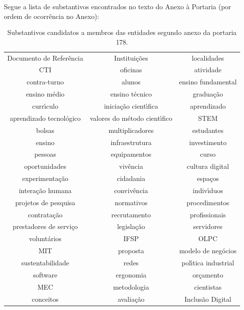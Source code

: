 \documentclass[
12pt,		%
openright,	%
twoside,  %
a4paper,			%
chapter=TITLE,		%
english,			%
french,				%
spanish,			%
brazil				%
]{USPSC-classe/USPSC_RedarTex}
\begin{document}
Segue a lista de substantivos encontrados no texto do Anexo \`a Portaria (por ordem de ocorr\^encia no Anexo):














\begin{table}[htb]
\tiny
\caption{\label{720fe19d2d63bd30c6a58cbaba39f2c561d04c94}Substantivos candidatos a membros das entidades segundo anexo da portaria 178.}

\centering
\begin{tabular}{|c|c|c|}
\hline
Documento de Refer\^encia  &  Institui\c{c}\~oes  &  localidades \\
CTI  &  oficinas  &  atividade  \\
contra-turno  &  alunos  &  ensino fundamental \\
ensino m\'edio  &  ensino t\'ecnico  &  gradua\c{c}\~ao \\
curr\'{\i}culo  &  inicia\c{c}\~ao cient\'{\i}fica  &  aprendizado \\
aprendizado tecnol\'ogico  &  valores do m\'etodo cient\'{\i}fico  &  STEM \\
bolsas  &  multiplicadores  &  estudantes \\
ensino  &  infraestrutura  &  investimento \\
pessoas  &  equipamentos  &  curso \\
oportunidades  &  viv\^encia  &  cultura digital \\
experimenta\c{c}\~ao  &  cidadania  &  espa\c{c}os \\
intera\c{c}\~ao humana  &  conviv\^encia  &  indiv\'{\i}duos  \\
projetos de pesquisa  &  normativos  &  procedimentos \\
contrata\c{c}\~ao  &  recrutamento  &  profissionais \\
prestadores de servi\c{c}o  &  legisla\c{c}\~ao  &  servidores \\
volunt\'arios  &  IFSP  &  OLPC \\
MIT  &  proposta  &  modelo de neg\'ocios \\
sustentabilidade  &  redes  &  pol\'{\i}tica industrial \\
software  &  ergonomia  &  or\c{c}amento \\
MEC  &  metodologia  &  cientistas  \\
conceitos  &  avalia\c{c}\~ao  &  Inclus\~ao Digital \\

\end{tabular}
\end{table}
\end{document}
